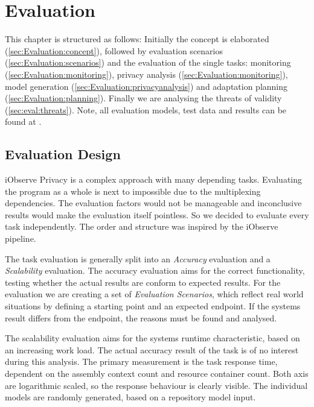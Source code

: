 
\chapter{Evaluation}
\label{ch:Evaluation}

This chapter is structured as follows: Initially the concept is elaborated (\autoref{sec:Evaluation:concept}), followed by evaluation scenarios (\autoref{sec:Evaluation:scenarios}) and the evaluation of the single tasks: monitoring (\autoref{sec:Evaluation:monitoring}), privacy analysis (\autoref{sec:Evaluation:monitoring}), model generation (\autoref{sec:Evaluation:privacyanalysis}) and  adaptation planning (\autoref{sec:Evaluation:planning}). Finally we are analysing the threats of validity (\autoref{sec:eval:threats}). Note, all evaluation models, test data and results can be found at \cite{privacy.PW}.

\section{Evaluation Design}
\label{sec:Evaluation:concept}

iObserve Privacy is a complex approach with many depending tasks. Evaluating the program as a whole is next to impossible due to the multiplexing dependencies. The evaluation factors would not be manageable and inconclusive results would make the evaluation itself pointless. So we decided to evaluate every task independently. The order and structure was inspired by the iObserve pipeline.

The task evaluation is generally split into an \textit{Accuracy} evaluation and a \textit{Scalability} evaluation. The accuracy evaluation aims for the correct functionality, testing whether the actual results are conform to expected results. For the evaluation we are creating a set of \textit{Evaluation Scenarios}, which reflect real world situations by defining a starting point and an expected endpoint. If the systems result differs from the endpoint, the reasons must be found and analysed.

The scalability evaluation aims for the systems runtime characteristic, based on an increasing work load. The actual accuracy result of the task is of no interest during this analysis. The primary measurement is the task response time, dependent on the assembly context count and resource container count. Both axis are logarithmic scaled, so the response behaviour is clearly visible. The individual models are randomly generated, based on a repository model input.

